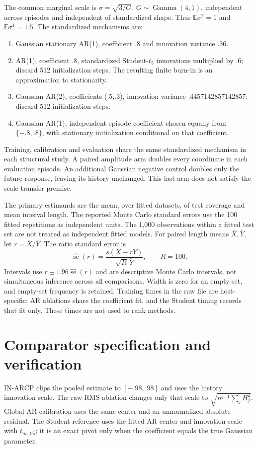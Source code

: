 \documentclass[10pt]{article}
\begin{document}
The common marginal scale is $\sigma=\sqrt{3/G}$, $G\sim\operatorname{Gamma}(4,1)$, independent across episodes and independent of standardized shape. Thus $\mathbb E\sigma^2=1$ and $\mathbb E\sigma^4=1.5$. The standardized mechanisms are:
\begin{enumerate}
\item Gaussian stationary AR(1), coefficient .8 and innovation variance .36.
\item AR(1), coefficient .8, standardized Student-$t_5$ innovations multiplied by .6; discard 512 initialization steps. The resulting finite burn-in is an approximation to stationarity.
\item Gaussian AR(2), coefficients (.5,.3), innovation variance .4457142857142857; discard 512 initialization steps.
\item Gaussian AR(1), independent episode coefficient chosen equally from $\{-.8,.8\}$, with stationary initialization conditional on that coefficient.
\end{enumerate}
Training, calibration and evaluation share the same standardized mechanism in each structural study. A paired amplitude arm doubles every coordinate in each evaluation episode. An additional Gaussian negative control doubles only the future response, leaving its history unchanged. This last arm does not satisfy the scale-transfer premise.

The primary estimands are the mean, over fitted datasets, of test coverage and mean interval length. The reported Monte Carlo standard errors use the 100 fitted repetitions as independent units. The 1,000 observations within a fitted test set are not treated as independent fitted models. For paired length means $\bar X,\bar Y$, let $r=\bar X/\bar Y$. The ratio standard error is
\[
\widehat{\operatorname{se}}(r)=\frac{s(X-rY)}{\sqrt{R}\,\bar Y},\qquad R=100.
\]
Intervals use $r\pm1.96\widehat{\operatorname{se}}(r)$ and are descriptive Monte Carlo intervals, not simultaneous inference across all comparisons. Width is zero for an empty set, and empty-set frequency is retained. Training times in the raw file are host-specific: AR ablations share the coefficient fit, and the Student timing records that fit only. These times are not used to rank methods.

\section{Comparator specification and verification}
IN-ARCP clips the pooled estimate to $[-.98,.98]$ and uses the history innovation scale. The raw-RMS ablation changes only that scale to $\sqrt{m^{-1}\sum_jH_j^2}$. Global AR calibration uses the same center and an unnormalized absolute residual. The Student reference uses the fitted AR center and innovation scale with $t_{m,.95}$; it is an exact pivot only when the coefficient equals the true Gaussian parameter.
\end{document}
